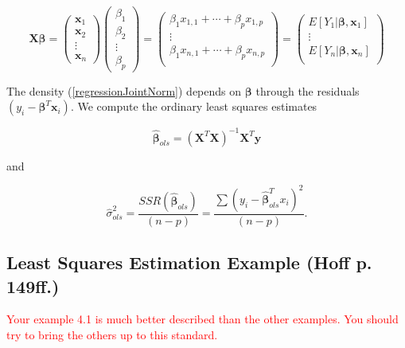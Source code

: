 \documentclass[12pt, a4paper]{article}
\begin{document}
\begin{equation*}
    \mathbf{X}\boldsymbol\beta =
    \begin{pmatrix}
        \mathbf{x}_1 \\
        \mathbf{x}_2 \\
        \vdots  \\
        \mathbf{x}_n
    \end{pmatrix}
    \begin{pmatrix}
        \beta_1 \\
        \beta_2 \\
        \vdots \\
        \beta_p
    \end{pmatrix}
    =
    \begin{pmatrix}
        \beta_1 x_{1,1} + \cdots + \beta_p x_{1,p} \\
        \vdots \\
        \beta_1 x_{n,1} + \cdots + \beta_p x_{n,p} \\
    \end{pmatrix}
    =
    \begin{pmatrix}
        E\left[Y_1|\mathbf{\boldsymbol\beta},\mathbf{x}_1\right] \\
        \vdots \\
        E\left[Y_n|\mathbf{\boldsymbol\beta},\mathbf{x}_n\right] \\
    \end{pmatrix}
\end{equation*}

\noindent The density (\ref{regressionJointNorm}) depends on $\boldsymbol\beta$ through the residuals $\left(y_i - \boldsymbol\beta^T\mathbf{x}_i\right)$.  We compute the ordinary least squares estimates

$$\hat{\boldsymbol\beta}_{ols} = \left(\mathbf{X}^T\mathbf{X}\right)^{-1}\mathbf{X}^T\mathbf{y}$$

\noindent and

$$\hat{\sigma}^2_{ols} = \frac{SSR\left(\hat{\boldsymbol\beta}_{ols}\right)}{(n-p)} = \frac{\sum\left(y_i - \hat{\boldsymbol\beta}_{ols}^T x_i\right)^2}{(n-p)}.$$




\subsection{Least Squares Estimation Example (Hoff p. 149ff.)}

\textcolor{red}{Your example 4.1 is much better described than the other examples. You
should try to bring the others up to this standard.}
\end{document}
